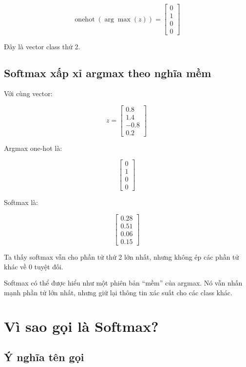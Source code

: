 \documentclass[12pt,a4paper]{report}
\begin{document}
\[
    \operatorname{onehot}(\arg\max(z))
    =
    \begin{bmatrix}
    0\\
    1\\
    0\\
    0
    \end{bmatrix}
\]

Đây là vector class thứ 2.

\section{Softmax xấp xỉ argmax theo nghĩa mềm}

Với cùng vector:

\[
    z =
    \begin{bmatrix}
    0.8\\
    1.4\\
    -0.8\\
    0.2
    \end{bmatrix}
\]

Argmax one-hot là:

\[
    \begin{bmatrix}
    0\\
    1\\
    0\\
    0
    \end{bmatrix}
\]

Softmax là:

\[
    \begin{bmatrix}
    0.28\\
    0.51\\
    0.06\\
    0.15
    \end{bmatrix}
\]

Ta thấy softmax vẫn cho phần tử thứ 2 lớn nhất, nhưng không ép các phần tử khác về 0 tuyệt đối.

\begin{ghinho}
Softmax có thể được hiểu như một phiên bản ``mềm'' của argmax. Nó vẫn nhấn mạnh phần tử lớn nhất, nhưng giữ lại thông tin xác suất cho các class khác.
\end{ghinho}

\chapter{Vì sao gọi là Softmax?}

\section{Ý nghĩa tên gọi}
\end{document}
